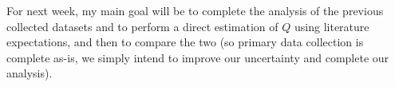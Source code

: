 \documentclass[12pt]{extarticle}
\begin{document}
For next week, my main goal will be to complete the analysis of the previous collected datasets and to perform a direct estimation of $Q$ using literature expectations, and then to compare the two (so primary data collection is complete as-is, we simply intend to improve our uncertainty and complete our analysis).
\end{document}
